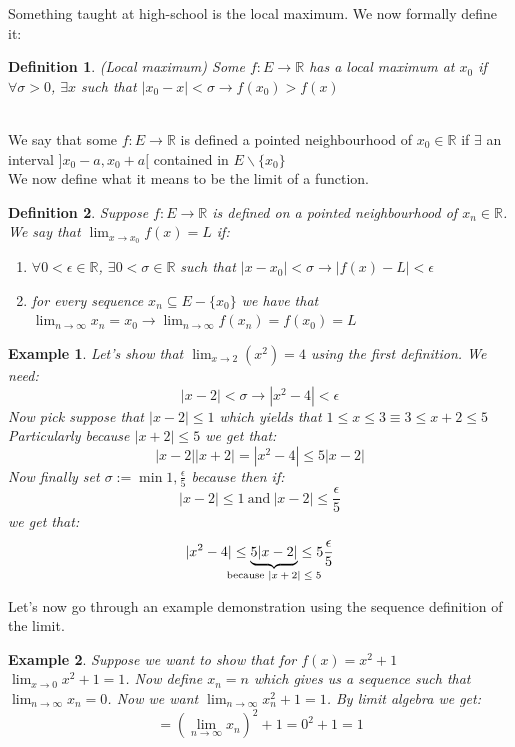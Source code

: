 \documentclass[titlepage]{article}
\newtheorem{definition}{Definition}
\newtheorem{example}{Example}[section]
\begin{document}
Something taught at high-school is the local maximum. We now formally define it:

\begin{definition}(Local maximum)
Some $f:E\to\mathbb{R}$ has a local maximum at $x_{0}$ if $\forall \sigma > 0$, $\exists x$ such that $|x_{0} - x| < \sigma \rightarrow f(x_{0}) > f(x)$
\end{definition}
\\

We say that some $f:E\to\mathbb{R}$ is defined a pointed neighbourhood of $x_{0} \in \mathbb{R}$ if $\exists$ an interval $]x_{0}-a,x_{0}+a[$ contained in $E\backslash\{x_{0}\}$
\\

We now define what it means to be the limit of a function. 

\begin{definition}
Suppose $f:E\to\mathbb{R}$ is defined on a pointed neighbourhood of $x_{n}\in \mathbb{R}$. We say that $\lim_{x \to x_{0}} f(x) = L$ if:
\begin{enumerate}
    \item $\forall 0 < \epsilon \in \mathbb{R}$, $\exists 0<\sigma \in \mathbb{R} $ such that $|x - x_{0}| < \sigma \rightarrow |f(x) - L| < \epsilon$
    \item for every sequence $x_{n} \subseteq E-\{x_{0}\}$ we have that $\lim_{n\to \infty}x_{n} = x_{0} \rightarrow \lim_{n\to\infty}f(x_{n})= f(x_{0}) = L$
\end{enumerate}
\end{definition}

\begin{example}
Let's show that $\lim_{x\to 2}(x^2) = 4$ using the first definition.
We need:
$$ |x-2| < \sigma \rightarrow |x^2 - 4| < \epsilon$$
Now pick suppose that $|x-2| \leq 1 $ which yields that $ 1\leq x \leq 3 \equiv 3\leq x + 2 \leq 5$ Particularly because $|x+2| \leq 5$ we get that:
$$ |x-2||x+2| = |x^2 - 4| \leq 5|x-2|$$
Now finally set $\sigma := \min{1,\frac{\epsilon}{5}}$ because then if:
$$ |x-2| \leq 1 \ \text{and} \ |x-2| \leq \frac{\epsilon}{5}$$ we get that:
$$ |x^2 - 4| \leq \underbrace{5|x-2|}_{\text{\makebox[0pt]{because $|x+2|\leq5$}}} \leq 5\frac{\epsilon}{5}$$
\end{example}
  
Let's now go through an example demonstration using the sequence definition of the limit.

\begin{example}
Suppose we want to show that for $f(x) = x^2 + 1$ $ \lim_{x \to 0} x^2 + 1 = 1$. Now define $x_{n} = n$ which gives us a sequence such that $\lim_{n \to \infty}x_{n} = 0$. Now we want $\lim_{n \to \infty}x_{n}^{2} + 1 = 1$. By limit algebra we get:
$$ = (\lim_{n \to \infty}x_{n})^2 + 1 = 0^2 + 1 = 1$$
\end{example}
\end{document}
